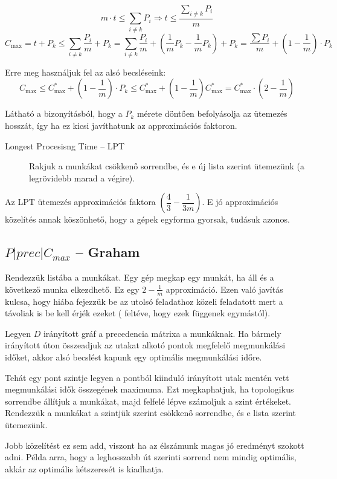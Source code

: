 \[ m \cdot t \leq \sum_{i \neq k}P_i \Rightarrow t \leq \frac{\sum\limits_{i \neq k}P_i}{m}
\]
\[ C_{\mbox{max}}=t+P_k \leq \sum_{i \neq  k} \frac{P_i}{m} + P_k = \sum_{i \neq
		k} \frac{P_i}{m} + \left(\frac{1}{m} P_k - \frac{1}{m} P_k\right) + P_k
	= \frac{\sum P_i}{m} + \left(1-\frac{1}{m}\right) \cdot P_k
\]

Erre meg használjuk fel az alsó becsléseink:
\[
	C_{\mbox{max}} \leq C^*_{\mbox{max}} + \left(1-\frac{1}{m}\right) \cdot P_k
	\leq C^*_{\mbox{max}} + \left(1-\frac{1}{m}\right) C^*_{\mbox{max}}
	=C^*_{\mbox{max}} \cdot \left(2-\frac{1}{m}\right)
\]

Látható a bizonyításból, hogy a $P_k$ mérete döntően befolyásolja az ütemezés
hosszát, így ha ez kicsi javíthatunk az approximációs faktoron.
\begin{description}
	\item[Longest Procesisng Time -- LPT ] Rakjuk a munkákat csökkenő
	      sorrendbe, és e új lista szerint ütemezünk (a legrövidebb marad a végire).
\end{description}

Az LPT ütemezés approximációs faktora $\left( \dfrac{4}{3} - \dfrac{1}{3m}
	\right)$. E jó approximációs közelítés annak köszönhető, hogy a gépek egyforma
gyorsak, tudásuk azonos.

\subsection{ \texorpdfstring {$ P|prec|C_{max} $} {P|prec|Cmax} -- Graham}

Rendezzük listába a munkákat. Egy gép megkap egy munkát, ha áll és a következő
munka elkezdhető. Ez egy $2-\frac{1}{m}$ approximáció. Ezen való javítás kulcsa,
hogy hiába fejezzük be az utolsó feladathoz közeli feladatott mert a távoliak is
be kell érjék ezeket ( feltéve, hogy ezek függenek egymástól).

Legyen $D$ irányított gráf a precedencia mátrixa a munkáknak. Ha bármely
irányított úton összeadjuk az utakat alkotó pontok megfelelő megmunkálási
időket, akkor alsó becslést kapunk egy optimális megmunkálási időre.

Tehát egy pont szintje legyen a pontból kiinduló irányított utak  mentén vett
megmunkálási idők összegének maximuma. Ezt megkaphatjuk, ha topologikus
sorrendbe állítjuk a munkákat, majd felfelé lépve számoljuk a szint értékeket.
Rendezzük a munkákat a szintjük szerint csökkenő sorrendbe, és e lista szerint
ütemezünk.

Jobb közelítést ez sem add, viszont ha az élszámunk magas jó eredményt szokott
adni. Példa arra, hogy a leghosszabb út szerinti sorrend nem mindig optimális,
akkár az optimális kétszeresét is kiadhatja.

